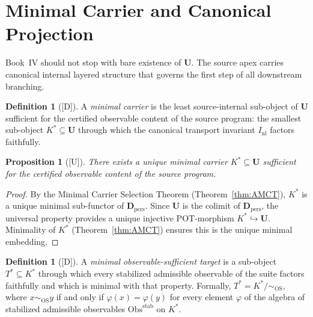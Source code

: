 \documentclass[12pt,oneside]{amsbook}
\theoremstyle{plain}
\newtheorem{proposition}[theorem]{Proposition}
\theoremstyle{definition}
\newtheorem{definition}[theorem]{Definition}
\theoremstyle{remark}
\newcommand{\status}[1]{\textup{[#1]}}
\begin{document}
\section{Minimal Carrier and Canonical Projection}

Book~IV should not stop with bare existence of $\mathbf{U}$.  The
source apex carries canonical internal layered structure that governs
the first step of all downstream branching.

\begin{definition}[\status{D}]\label{def:minimal-carrier}
A \emph{minimal carrier} is the least source-internal sub-object of
$\mathbf{U}$ sufficient for the certified observable content of the
source program: the smallest sub-object $K^* \subseteq \mathbf{U}$
through which the canonical transport invariant $I_{\mathrm{nl}}$
factors faithfully.
\end{definition}

\begin{proposition}[\status{U}]\label{prop:K-star-exists}
There exists a unique minimal carrier $K^* \subseteq \mathbf{U}$
sufficient for the certified observable content of the source program.
\end{proposition}

\begin{proof}
By the Minimal Carrier Selection Theorem (Theorem~\ref{thm:AMCT}),
$K^*$ is a unique minimal sub-functor of $\mathbf{D}_{\mathrm{pers}}$.
Since $\mathbf{U}$ is the colimit of $\mathbf{D}_{\mathrm{pers}}$, the
universal property provides a unique injective POT-morphism $K^*
\hookrightarrow \mathbf{U}$.  Minimality of $K^*$
(Theorem~\ref{thm:AMCT}) ensures this is the unique minimal
embedding.
\end{proof}

\begin{definition}[\status{D}]\label{def:obs-sufficient-target}
A \emph{minimal observable-sufficient target} is a sub-object $T^*
\subseteq K^*$ through which every stabilized admissible observable of
the suite factors faithfully and which is minimal with that property.
Formally, $T^* = K^*/{\sim_{\mathrm{OS}}}$, where $x \sim_{\mathrm{OS}}
y$ if and only if $\varphi(x) = \varphi(y)$ for every element
$\varphi$ of the algebra of stabilized admissible observables
$\mathrm{Obs}^{\mathrm{stab}}$ on $K^*$.
\end{definition}
\end{document}

